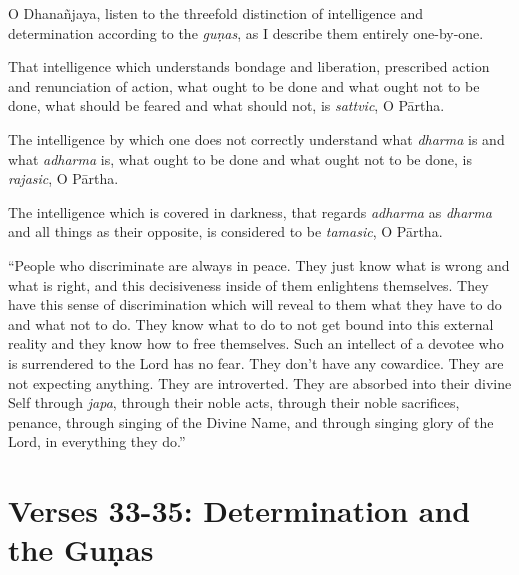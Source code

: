 {O Dhanañjaya, listen to the threefold distinction of intelligence and determination according to the \textit{guṇas}, as I describe them entirely one-by-one.}

{That intelligence which understands bondage and liberation, prescribed action and renunciation of action, what ought to be done and what ought not to be done, what should be feared and what should not, is \textit{sattvic}, O Pārtha.}

{The intelligence by which one does not correctly understand what \textit{dharma} is and what \textit{adharma} is, what ought to be done and what ought not to be done, is \textit{rajasic}, O Pārtha.}

{The intelligence which is covered in darkness, that regards \textit{adharma} as \textit{dharma} and all things as their opposite, is considered to be \textit{tamasic}, O Pārtha.}

\enquote{People who discriminate are always in peace. They just know what is wrong and what is right, and this decisiveness inside of them enlightens themselves. They have this sense of discrimination which will reveal to them what they have to do and what not to do. They know what to do to not get bound into this external reality and they know how to free themselves. Such an intellect of a devotee who is surrendered to the Lord has no fear. They don’t have any cowardice. They are not expecting anything. They are introverted. They are absorbed into their divine Self through \textit{japa}, through their noble acts, through their noble sacrifices, penance, through singing of the Divine Name, and through singing glory of the Lord, in everything they do.}

\section{Verses 33-35: Determination and the Guṇas}\label{sec-verses-33-35-determination-and-the-gunas}

